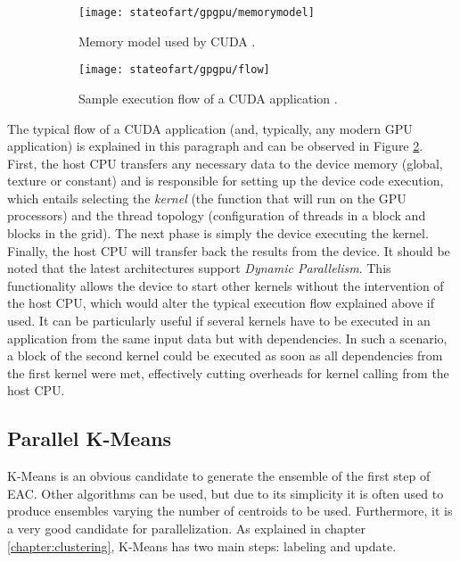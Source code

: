 \begin{figure}[!ht]
    \centering
    \begin{subfigure}[b]{0.45\textwidth}
        \centering
        \texttt{[image: stateofart/gpgpu/memorymodel]}
        \caption{Memory model used by CUDA \cite{Nvidia2014}.}
        \label{fig:memorymodel}
    \end{subfigure}
    \hfill
    \begin{subfigure}[b]{0.45\textwidth}
        \centering
        \texttt{[image: stateofart/gpgpu/flow]}
        \caption{Sample execution flow of a CUDA application \cite{Nvidia2014}.}
        \label{fig:cudaflow}
    \end{subfigure}
    \caption{}
    \label{fig:cuda fig2}
\end{figure}

The typical flow of a CUDA application (and, typically, any modern GPU application) is explained in this paragraph and can be observed in Figure \ref{fig:cudaflow}.
First, the host CPU transfers any necessary data to the device memory (global, texture or constant) and is responsible for setting up the device code execution, which entails selecting the \emph{kernel} (the function that will run on the GPU processors) and the thread topology (configuration of threads in a block and blocks in the grid).
The next phase is simply the device executing the kernel.
Finally, the host CPU will transfer back the results from the device.
It should be noted that the latest architectures support \emph{Dynamic Parallelism}.
This functionality allows the device to start other kernels without the intervention of the host CPU, which would alter the typical execution flow explained above if used.
It can be particularly useful if several kernels have to be executed in an application from the same input data but with dependencies.
In such a scenario, a block of the second kernel could be executed as soon as all dependencies from the first kernel were met, effectively cutting overheads for kernel calling from the host CPU.


\subsection{Parallel K-Means}

K-Means is an obvious candidate to generate the ensemble of the first step of EAC.
Other algorithms can be used, but due to its simplicity it is often used to produce ensembles varying the number of centroids to be used.
Furthermore, it is a very good candidate for parallelization.
As explained in chapter \ref{chapter:clustering}, K-Means has two main steps: labeling and update.


